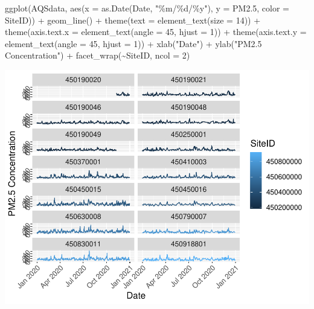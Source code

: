 \documentclass[
]{article}
\newenvironment{Shaded}{\begin{snugshade}}{\end{snugshade}}
\newcommand{\AttributeTok}[1]{\textcolor[rgb]{0.77,0.63,0.00}{#1}}
\newcommand{\DecValTok}[1]{\textcolor[rgb]{0.00,0.00,0.81}{#1}}
\newcommand{\FloatTok}[1]{\textcolor[rgb]{0.00,0.00,0.81}{#1}}
\newcommand{\FunctionTok}[1]{\textcolor[rgb]{0.00,0.00,0.00}{#1}}
\newcommand{\NormalTok}[1]{#1}
\newcommand{\SpecialCharTok}[1]{\textcolor[rgb]{0.00,0.00,0.00}{#1}}
\newcommand{\StringTok}[1]{\textcolor[rgb]{0.31,0.60,0.02}{#1}}
\begin{document}
\begin{Shaded}
\begin{Highlighting}[]
\FunctionTok{ggplot}\NormalTok{(AQSdata, }\FunctionTok{aes}\NormalTok{(}\AttributeTok{x =} \FunctionTok{as.Date}\NormalTok{(Date, }\StringTok{"\%m/\%d/\%y"}\NormalTok{), }\AttributeTok{y =}\NormalTok{ PM2}\FloatTok{.5}\NormalTok{,}
    \AttributeTok{color =}\NormalTok{ SiteID)) }\SpecialCharTok{+} \FunctionTok{geom\_line}\NormalTok{() }\SpecialCharTok{+} \FunctionTok{theme}\NormalTok{(}\AttributeTok{text =} \FunctionTok{element\_text}\NormalTok{(}\AttributeTok{size =} \DecValTok{14}\NormalTok{)) }\SpecialCharTok{+}
    \FunctionTok{theme}\NormalTok{(}\AttributeTok{axis.text.x =} \FunctionTok{element\_text}\NormalTok{(}\AttributeTok{angle =} \DecValTok{45}\NormalTok{, }\AttributeTok{hjust =} \DecValTok{1}\NormalTok{)) }\SpecialCharTok{+}
    \FunctionTok{theme}\NormalTok{(}\AttributeTok{axis.text.y =} \FunctionTok{element\_text}\NormalTok{(}\AttributeTok{angle =} \DecValTok{45}\NormalTok{, }\AttributeTok{hjust =} \DecValTok{1}\NormalTok{)) }\SpecialCharTok{+}
    \FunctionTok{xlab}\NormalTok{(}\StringTok{"Date"}\NormalTok{) }\SpecialCharTok{+} \FunctionTok{ylab}\NormalTok{(}\StringTok{"PM2.5 Concentration"}\NormalTok{) }\SpecialCharTok{+} \FunctionTok{facet\_wrap}\NormalTok{(}\SpecialCharTok{\textasciitilde{}}\NormalTok{SiteID,}
    \AttributeTok{ncol =} \DecValTok{2}\NormalTok{)}
\end{Highlighting}
\end{Shaded}

\includegraphics{HW1-Trinath-Sai-Subhash-Reddy-Pittala_files/figure-latex/unnamed-chunk-27-1.pdf}
\end{document}
